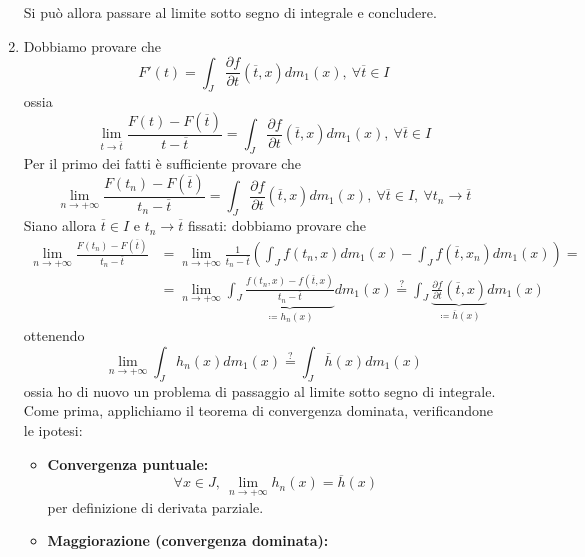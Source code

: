 \begin{demonstrationcaputwt}
\begin{enumerate}[label=\Roman*]
		Si può allora passare al limite sotto segno di integrale e concludere.
		\item Dobbiamo provare che
		\begin{equation*}
			F'(t)=\int_J\frac{\partial f}{\partial t}\left(\overline{t},x\right)dm_1(x),\ \forall \overline{t}\in I
		\end{equation*}
		ossia
		\begin{equation*}
			\lim_{t\to\overline{t}}\frac{F(t)-F\left(\overline{t}\right)}{t-\overline{t}}=\int_J\frac{\partial f}{\partial t}\left(\overline{t},x\right)dm_1(x),\ \forall \overline{t}\in I
		\end{equation*}
		Per il primo dei fatti è sufficiente provare che
		\begin{equation*}
			\lim_{n\to+\infty}\frac{F\left(t_n\right)-F\left(\overline{t}\right)}{t_n-\overline{t}}= \int_J\frac{\partial f}{\partial t}\left(\overline{t},x\right)dm_1(x),\ \forall \overline{t}\in I,\ \forall t_n\to \overline{t}
		\end{equation*}
		Siano allora $\overline{t}\in I$ e $t_n\to\overline{t}$ fissati: dobbiamo provare che
		\begin{align*}
			\lim_{n\to+\infty}\frac{F\left(t_n\right)-F\left(\overline{t}\right)}{t_n-\overline{t}}& = \lim_{n\to+\infty}\frac{1}{t_n-\overline{t}}\left(\int_Jf\left(t_n,x\right)dm_1(x)-\int_Jf\left(\overline{t},x_n\right)dm_1(x)\right)=\\
			&=\lim_{n\to+\infty}\int_J\underbrace{\frac{f\left(t_n,x\right)-f\left(\overline{t},x\right)}{t_n-\overline{t}}}_{\coloneqq h_n(x)}dm_1(x) \stackrel{?}{=} \int_J\underbrace{\frac{\partial f}{\partial t}\left(\overline{t},x\right)}_{\coloneqq \overline{h}(x)}dm_1(x)
		\end{align*}
		ottenendo
		\begin{equation*}
			\lim_{n\to+\infty}\int_Jh_n(x)dm_1(x) \stackrel{?}{=} \int_J\overline{h}(x)dm_1(x)
		\end{equation*}
		ossia ho di nuovo un problema di passaggio al limite sotto segno di integrale. Come prima, applichiamo il teorema di convergenza dominata, verificandone le ipotesi:
		\begin{itemize}
			\item \textbf{Convergenza puntuale:}
			\begin{equation*}
				\forall x\in J,\ \lim_{n\to+\infty}h_n(x)=\overline{h}(x)
			\end{equation*}
			per definizione di derivata parziale.
			\item \textbf{Maggiorazione (convergenza dominata):}

\end{itemize}
\end{enumerate}
\end{demonstrationcaputwt}
